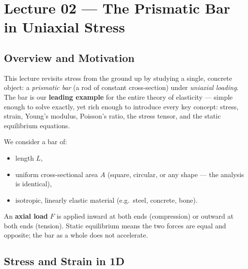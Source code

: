 
\section{Lecture 02 — The Prismatic Bar in Uniaxial Stress}
\label{sec:lec02}

\subsection*{Overview and Motivation}

This lecture revisits stress from the ground up by studying a single,
concrete object: a \emph{prismatic bar} (a rod of constant cross-section)
under \emph{uniaxial loading}.  The bar is our \textbf{leading example}
for the entire theory of elasticity — simple enough to solve exactly, yet
rich enough to introduce every key concept: stress, strain, Young's
modulus, Poisson's ratio, the stress tensor, and the static equilibrium
equations.

We consider a bar of:
\begin{itemize}
    \item length $L$,
    \item uniform cross-sectional area $A$ (square, circular, or any
          shape — the analysis is identical),
    \item isotropic, linearly elastic material (e.g.\ steel, concrete,
          bone).
\end{itemize}
An \textbf{axial load} $F$ is applied inward at both ends (compression)
or outward at both ends (tension).  Static equilibrium means the two
forces are equal and opposite; the bar as a whole does not accelerate.

\subsection{Stress and Strain in 1D}
\label{subsec:lec02:1d}

